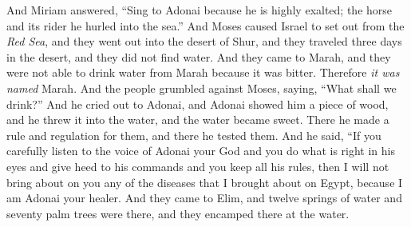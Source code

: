 \begin{biblechapter}
\verse And Miriam answered, “Sing to Adonai because he is highly exalted; the horse and its rider he hurled into the sea.”
 And Moses caused Israel to set out from the \textit{Red Sea}, and they went out into the desert of Shur, and they traveled three days in the desert, and they did not find water.
\verse And they came to Marah, and they were not able to drink water from Marah because it was bitter. Therefore \textit{it was named} Marah.
\verse And the people grumbled against Moses, saying, “What shall we drink?”
\verse And he cried out to Adonai, and Adonai showed him a piece of wood, and he threw it into the water, and the water became sweet. There he made a rule and regulation for them, and there he tested them.
\verse And he said, “If you carefully listen to the voice of Adonai your God and you do what is right in his eyes and give heed to his commands and you keep all his rules, then I will not bring about on you any of the diseases that I brought about on Egypt, because I am Adonai your healer.
\verse And they came to Elim, and twelve springs of water and seventy palm trees were there, and they encamped there at the water.
\end{biblechapter}

